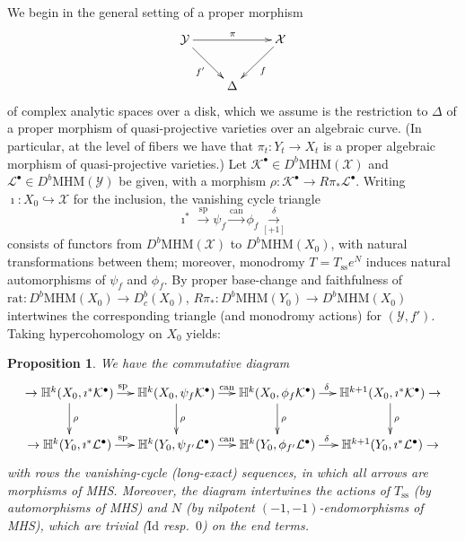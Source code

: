 \documentclass[12pt,letterpaper,english]{amsart}
\numberwithin{equation}{section}
\numberwithin{figure}{section}
\theoremstyle{plain}
\theoremstyle{remark}
\theoremstyle{definition}
\theoremstyle{definition}
\theoremstyle{plain}
\theoremstyle{plain}
\newtheorem{prop}[equation]{Proposition}
\theoremstyle{plain}
\theoremstyle{plain}
\theoremstyle{definition}
\def\b{\bullet}
\def\Y{\mathcal{Y}}
\def\X{\mathcal{X}}
\def\Y{\mathcal{Y}}
\def\HH{\mathbb{H}}
\def\K{\mathcal{K}}
\def\L{\mathcal{L}}
\def\MHM{\mathrm{MHM}}
\def\sp{\mathrm{sp}}
\def\can{\mathrm{can}}
\def\f{f'}
\theoremstyle{definition}
\begin{document}
We begin in the general setting of a proper morphism
\begin{equation}\label{A1}
\xymatrix{\Y \ar [rr]^{\pi} \ar [rd]_{\f} && \X \ar [ld]^f \\ & \Delta }
\end{equation}
of complex analytic spaces over a disk, which we assume is the restriction to $\Delta$ of a proper morphism of quasi-projective varieties over an algebraic curve.  (In particular, at the level of fibers we have that $\pi_t\colon Y_t\to X_t$ is a proper algebraic morphism of quasi-projective varieties.) Let $\K^{\b}\in D^b\mathrm{MHM}(\X)$ and $\L^{\b}\in D^b\mathrm{MHM}(\Y)$ be given, with a morphism $\rho\colon \K^{\b}\to R\pi_*\L^{\b}$.  Writing $\imath\colon X_0\hookrightarrow \X$ for the inclusion, the vanishing cycle triangle
\begin{equation}\label{A2}
\imath^*\overset{\mathrm{sp}}{\longrightarrow}\psi_f \overset{\mathrm{can}}{\longrightarrow}\phi_f \overset{\delta}{\underset{[+1]}{\longrightarrow}}
\end{equation}
consists of functors from $D^b\mathrm{MHM}(\X)$ to $D^b\mathrm{MHM}(X_0)$, with natural transformations between them; moreover, monodromy $T=T_{\mathrm{ss}}e^N$ induces natural automorphisms of $\psi_f$ and $\phi_f$.  By proper base-change and faithfulness of $\mathrm{rat}\colon D^b\mathrm{MHM}(X_0)\to D^b_c(X_0)$, $R\pi_*\colon D^b\MHM(Y_0)\to D^b \MHM(X_0)$ intertwines the corresponding triangle (and monodromy actions) for $(\Y,\f)$.  Taking hypercohomology on $X_0$ yields:

\begin{prop}\label{A3}
We have the commutative diagram\small
\[\xymatrix@C=13pt{\to \HH^k(X_0,\imath^*\K^{\b}) \ar [r]^{\sp}	\ar [d]^{\rho} & \HH^k(X_0,\psi_f\K^{\b}) \ar [r]^{\can} \ar [d]^{\rho} & \HH^k(X_0,\phi_f\K^{\b}) \ar [r]^{\delta\mspace{25mu}} \ar [d]^{\rho} & \HH^{k+1}(X_0,\imath^*\K^{\b})\to \ar [d]^{\rho}\\ \to \HH^k(Y_0,\imath^*\L^{\b}) \ar [r]^{\sp} & \HH^k(Y_0,\psi_{\f}\L^{\b}) \ar [r]^{\can} & \HH^k(Y_0,\phi_{\f}\L^{\b}) \ar [r]^{\delta\mspace{25mu}} & \HH^{k+1}(Y_0,\imath^*\L^{\b})\to }
\]\normalsize
with rows the vanishing-cycle \textup{(}long-exact\textup{)} sequences, in which all arrows are morphisms of MHS. Moreover, the diagram intertwines the actions of $T_{\mathrm{ss}}$ \textup{(}by automorphisms of MHS\textup{)} and $N$ \textup{(}by nilpotent $(-1,-1)$-endomorphisms of MHS\textup{)}, which are trivial \textup{(}$\mathrm{Id}$ resp.~$0$\textup{)} on the end terms.
\end{prop}
\end{document}
